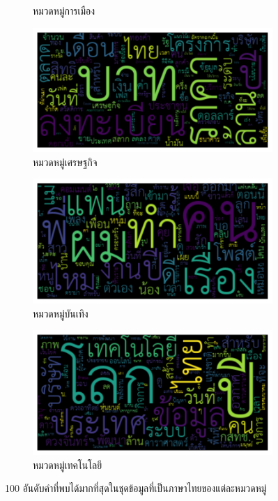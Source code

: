 \documentclass[12pt,oneside,openright,a4paper]{cpe-thai-project}
\begin{document}
\begin{itemize}
\begin{figure}[!ht]
\begin{subfigure}{0.49\textwidth}
            \caption{หมวดหมู่การเมือง}
            \label{fig:subim_th4}
          \end{subfigure}
          \begin{subfigure}{0.49\textwidth}
            \includegraphics[width=\linewidth]{./img/thai_stat/money_wc.png} 
            \caption{หมวดหมู่เศรษฐกิจ}
            \label{fig:subim_th3}
          \end{subfigure}
          \begin{subfigure}{0.49\textwidth}
            \includegraphics[width=\linewidth]{./img/thai_stat/ent_wc.png} 
            \caption{หมวดหมู่บันเทิง}
            \label{fig:subim_th5}
          \end{subfigure}
          \begin{subfigure}{0.49\textwidth}
            \includegraphics[width=\linewidth]{./img/thai_stat/tech_wc.png}
            \caption{หมวดหมู่เทคโนโลยี}
            \label{fig:subim_th6}
          \end{subfigure}
          \caption{100 อันดับคำที่พบได้มากที่สุดในชุดข้อมูลที่เป็นภาษาไทยของแต่ละหมวดหมู่}
          \label{fig:tag_wc_thai}
        \end{figure}
        

\end{itemize}
\end{document}
